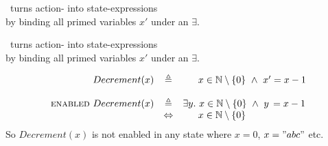 {

\vspace{25pt}
        
 \enabled\ turns action- into state-expressions \\ 
    \hfill  by binding all primed variables $x'$ under an $\exists$. 

\vspace{100pt}
}


{

\vspace{25pt}

 \enabled\ turns action- into state-expressions \\ 
    \hfill  by binding all primed variables $x'$ under an $\exists$. 

\begin{example}[\enabled]
\[
\begin{array}{ r c l}
Decrement(x) &   \triangleq &  \hspace{16pt} x \in \mathbb{N} \setminus \{0\}\  \wedge\   x' = x-1 \\
\\
\textsc{enabled}\ Decrement(x) & \triangleq &  \exists y.\ x \in \mathbb{N} \setminus \{0\} \ \wedge\  y\, = x - 1 \\
& \Leftrightarrow & \hspace{16pt} x \in \mathbb{N} \setminus  \{0\}
\end{array}
\]
\scriptsize
\hfill So $Decrement(x)$ is not enabled in any state where $x=0$, $x = "abc"$ etc.
\end{example}

}


